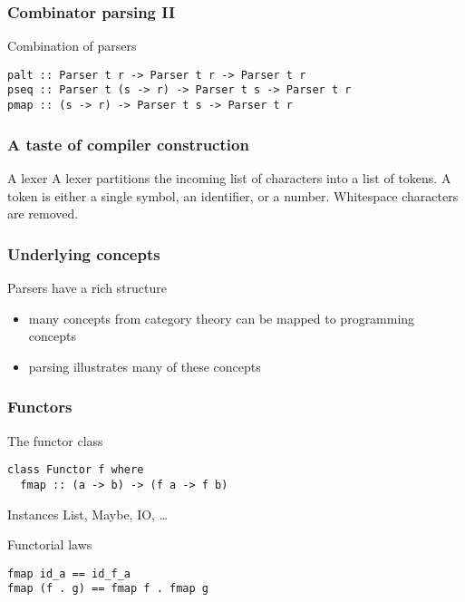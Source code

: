 \documentclass{beamer}
\begin{document}
\begin{frame}[fragile]
  \frametitle{Combinator parsing II}
  \begin{block}{Combination of parsers}
\begin{lstlisting}
palt :: Parser t r -> Parser t r -> Parser t r
pseq :: Parser t (s -> r) -> Parser t s -> Parser t r
pmap :: (s -> r) -> Parser t s -> Parser t r
\end{lstlisting}
\end{block}     
\end{frame}             


\begin{frame}[fragile]
  \frametitle{A taste of compiler construction}
\begin{block}{A lexer}
 A lexer partitions the incoming list of
 characters into a list of tokens. A token is either a single symbol, 
 an identifier, or a number. Whitespace characters are removed.
\end{block}
\end{frame}     


\begin{frame}[fragile]
  \frametitle{Underlying concepts}
  \begin{alertblock}{Parsers have a rich structure}
    \begin{itemize}
    \item many concepts from category theory can be mapped to programming concepts
    \item parsing illustrates many of these concepts
    \end{itemize}
  \end{alertblock}
\end{frame}             


\begin{frame}[fragile]
  \frametitle{Functors}
  \begin{alertblock}{The functor class}
\begin{lstlisting}
class Functor f where
  fmap :: (a -> b) -> (f a -> f b)
\end{lstlisting}  
\end{alertblock}

\begin{exampleblock}{Instances}
  List, Maybe, IO, \dots
\end{exampleblock}
\begin{alertblock}{Functorial laws}
\begin{lstlisting}
fmap id_a == id_f_a
fmap (f . g) == fmap f . fmap g
\end{lstlisting}
\end{alertblock}
\end{frame}             
\end{document}
